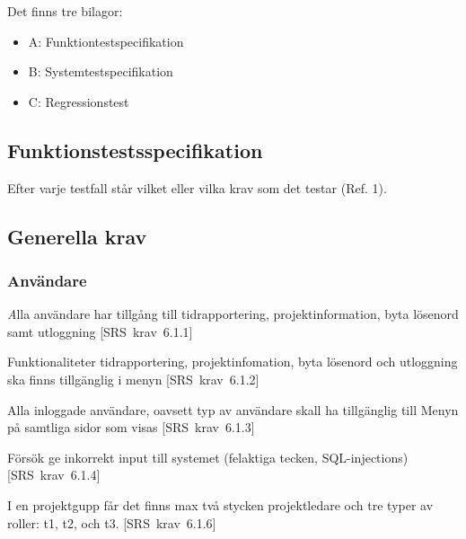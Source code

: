\documentclass[a4paper]{article}
\def\reqinside{\hfil\penalty 100 \hfilneg \hbox}
\def \req [#1]{\reqinside{[SRS krav #1]}}
\begin{document}
Det finns tre bilagor:

\begin{itemize}
\item A: Funktiontestspecifikation
\item B: Systemtestspecifikation
\item C: Regressionstest

\end{itemize}

\newpage

\begin{appendices}

\section{Funktionstestsspecifikation}
Efter varje testfall står vilket eller vilka krav som det testar (Ref. 1).


\subsection{Generella krav}

\subsubsection{Användare}

\begin{FT}
\item
\emph Alla användare har tillgång till tidrapportering, projektinformation, byta lösenord samt utloggning \req[6.1.1]

\item
Funktionaliteter tidrapportering, projektinfomation, byta lösenord och utloggning ska finns tillgänglig i menyn \req[6.1.2]

\item Alla inloggade användare, oavsett typ  av användare skall ha tillgänglig till Menyn på samtliga sidor som visas \req[6.1.3]

\item
Försök ge inkorrekt input till systemet (felaktiga tecken, SQL-injections) \req[6.1.4]

\item
I en projektgupp får det finns max två stycken projektledare och tre typer av roller: t1, t2, och t3. \req[6.1.6]
\end{FT}


\end{appendices}
\end{document}
